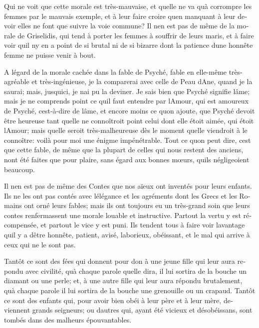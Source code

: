 \documentclass[14pt,a4paper]{memoir}
\begin{document}
{{\begin{otherlanguage}{french}
Qui ne voit que cette morale est très-mauvaise, et
qu\textquotesingle elle ne va qu\textquotesingle à corrompre les femmes
par le mauvais exemple, et à leur faire croire qu\textquotesingle en
manquant à leur devoir elles ne font que suivre la voie commune? Il
n\textquotesingle en est pas de même de la morale de Griselidis, qui
tend à porter les femmes à souffrir de leurs maris, et à faire voir
qu\textquotesingle il n\textquotesingle y en a point de si brutal ni de
si bizarre dont la patience d\textquotesingle une honnête femme ne
puisse venir à bout.

A l\textquotesingle égard de la morale cachée dans la fable de Psyché,
fable en elle-même très-agréable et très-ingénieuse, je la comparerai
avec celle de Peau d\textquotesingle Ane, quand je la saurai; mais,
jusqu\textquotesingle ici, je n\textquotesingle ai pu la deviner. Je
sais bien que Psyché signifie l\textquotesingle âme; mais je ne
comprends point ce qu\textquotesingle il faut entendre par
l\textquotesingle Amour, qui est amoureux de Psyché,
c\textquotesingle est-à-dire de l\textquotesingle âme, et encore moins
ce qu\textquotesingle on ajoute, que Psyché devoit être heureuse tant
qu\textquotesingle elle ne connoîtroit point celui dont elle étoit
aimée, qui étoit l\textquotesingle Amour; mais qu\textquotesingle elle
seroit très-malheureuse dès le moment qu\textquotesingle elle viendroit
à le connoître: voilà pour moi une énigme impénétrable. Tout ce
qu\textquotesingle on peut dire, c\textquotesingle est que cette fable,
de même que la plupart de celles qui nous restent des anciens,
n\textquotesingle ont été faites que pour plaire, sans égard aux bonnes
mœurs, qu\textquotesingle ils négligeoient beaucoup.

Il n\textquotesingle en est pas de même des Contes que nos aïeux ont
inventés pour leurs enfants. Ils ne les ont pas contés avec
l\textquotesingle élégance et les agréments dont les Grecs et les
Romains ont orné leurs fables; mais ils ont toujours eu un très-grand
soin que leurs contes renfermassent une morale louable et instructive.
Partout la vertu y est récompensée, et partout le vice y est puni. Ils
tendent tous à faire voir l\textquotesingle avantage
qu\textquotesingle il y a d\textquotesingle être honnête, patient,
avisé, laborieux, obéissant, et le mal qui arrive à ceux qui ne le sont
pas.

Tantôt ce sont des fées qui donnent pour don à une jeune fille qui leur
aura repondu avec civilité, qu\textquotesingle à chaque parole
qu\textquotesingle elle dira, il lui sortira de la bouche un diamant ou
une perle; et, à une autre fille qui leur aura répondu brutalement,
qu\textquotesingle à chaque parole il lui sortira de la bouche une
grenouille ou un crapaud. Tantôt ce sont des enfants qui, pour avoir
bien obéi à leur père et à leur mère, deviennent grands seigneurs; ou
d\textquotesingle autres qui, ayant été vicieux et désobéissans, sont
tombés dans des malheurs épouvantables.


\end{otherlanguage}}}
\end{document}
